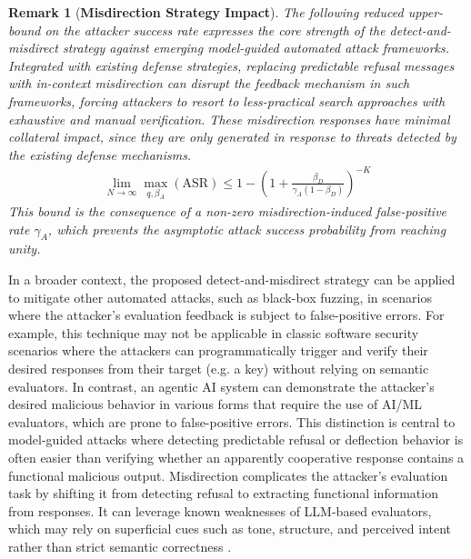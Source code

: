 \documentclass[conference,compsoc]{IEEEtran}
\newtheorem{remark}{Remark}
\begin{document}
\begin{remark}[\textbf{Misdirection Strategy Impact}]
    \label{rem3}
    The following reduced upper-bound on the attacker success rate expresses the core strength of the detect-and-misdirect strategy against emerging model-guided automated attack frameworks.
    Integrated with existing defense strategies, replacing predictable refusal messages with in-context misdirection can disrupt the feedback mechanism in such frameworks, forcing attackers to resort to less-practical search approaches with exhaustive and manual verification.
    These misdirection responses have minimal collateral impact, since they are only generated in response to threats detected by the existing defense mechanisms.
    \begin{align} \label{uppereq}
        \boxed{\lim_{N\to\infty} \max_{q,\beta_A}(\mathrm{ASR}) \le  1-\left(1 + \frac{\beta_D}{\gamma_A(1-\beta_D)}\right)^{-K}}
    \end{align}
    This bound is the consequence of a non-zero misdirection-induced false-positive rate $\gamma_A$, which prevents the asymptotic attack success probability from reaching unity.
\end{remark}

In a broader context, the proposed detect-and-misdirect strategy can be applied to mitigate other automated attacks, such as black-box fuzzing, in scenarios where the attacker's evaluation feedback is subject to false-positive errors.
For example, this technique may not be applicable in classic software security scenarios where the attackers can programmatically trigger and verify their desired responses from their target (e.g. a key) without relying on semantic evaluators.
In contrast, an agentic AI system can demonstrate the attacker's desired malicious behavior in various forms that require the use of AI/ML evaluators, which are prone to false-positive errors.
This distinction is central to model-guided attacks where detecting predictable refusal or deflection behavior is often easier than verifying whether an apparently cooperative response contains a functional malicious output.
Misdirection complicates the attacker's evaluation task by shifting it from detecting refusal to extracting functional information from responses.
It can leverage known weaknesses of LLM-based evaluators, which may rely on superficial cues such as tone, structure, and perceived intent rather than strict semantic correctness \cite{chen2024humans, wang2024fair}.
\end{document}
